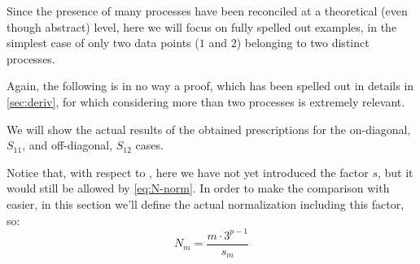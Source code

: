 Since the presence of many processes have been reconciled at a theoretical
(even though abstract) level, here we will focus on fully spelled out examples,
in the simplest case of only two data points ($1$ and $2$) belonging to two
distinct processes.

Again, the following is in no way a proof, which has been spelled out in
details in \cref{sec:deriv}, for which considering more than two processes is
extremely relevant.

We will show the actual results of the obtained prescriptions for the
on-diagonal, $S_{11}$, and off-diagonal, $S_{12}$ cases.

Notice that, with respect to \cite{NNPDF:2019ubu}, here we have not yet
introduced the factor $s$, but it would still be allowed by \cref{eq:N-norm}.
In order to make the comparison with \cite{NNPDF:2019ubu} easier, in this
section we'll define the actual normalization including this factor, so: 
\begin{equation}
    N_m = \frac{m \cdot 3^{p-1}}{s_m}
\end{equation}

